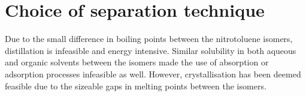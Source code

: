 
\section{Choice of separation technique}

Due to the small difference in boiling points between the nitrotoluene isomers, distillation is infeasible and energy intensive. Similar solubility in both aqueous and organic solvents between the isomers made the use of absorption or adsorption processes infeasible as well. However, crystallisation has been deemed feasible due to the sizeable gaps in melting points between the isomers.

\begin{table}[h]
\centering
\caption{Thermophysical properties of ONT, MNT, and PNT, where data were obtained from NIST \cite{noauthor_nist_2021}}
\label{tab:propoerties of P,M,O NTs}
\end{table}


